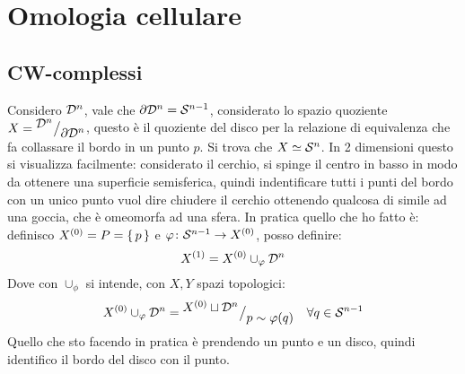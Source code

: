 
\chapter{Omologia cellulare}

\section{CW-complessi}

Considero $ \mathcal{D}^{n} $, vale che $ \partial\mathcal{D}^{n} = \mathcal{S}^{n-1} $, considerato lo spazio quoziente
$ X = {^{\textstyle \mathcal{D}^{n}}\big/_{\textstyle \partial \mathcal{D}^{n}}} $, questo è il quoziente del disco per la relazione
di equivalenza che fa collassare il bordo in un punto $ p $. Si trova che $ X \simeq \mathcal{S}^{n} $.
In 2 dimensioni questo si visualizza facilmente: considerato il cerchio, si spinge il centro
in basso in modo da ottenere una superficie semisferica, quindi indentificare tutti i punti
del bordo con un unico punto vuol dire chiudere il cerchio ottenendo qualcosa di simile ad
una goccia, che è omeomorfa ad una sfera. In pratica quello che ho fatto è:
definisco $ X^{(0)} = P = \set{p} $ e $ \varphi \colon \mathcal{S}^{n-1} \to X^{(0)} $, posso definire:
\[
  X^{(1)} = X^{(0)} \cup_\varphi \mathcal{D}^{n}
\]
Dove con $ \cup_\phi $ si intende, con $ X, Y $ spazi topologici:
\[
  X^{(0)} \cup_\varphi \mathcal{D}^{n} = {^{\textstyle X^{(0)} \sqcup \mathcal{D}^{n}}\big/_{\textstyle p \sim \varphi(q)}} \quad \forall q \in \mathcal{S}^{n-1}
\]
Quello che sto facendo in pratica è prendendo un punto e un disco, quindi
identifico il bordo del disco con il punto.



